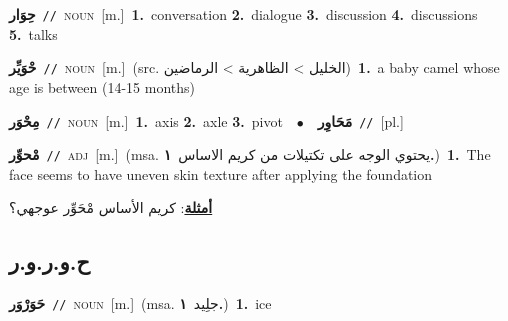 \documentclass[10pt,a4paper,twoside]{article} %
\begin{document}
\begin{multicols}{2}
{\setlength\topsep{0pt}\textbf{\foreignlanguage{arabic}{حِوَار}}\ {\color{gray}\texttt{//}\color{black}}\ \textsc{noun}\ [m.]\ \textbf{1.}~conversation  \textbf{2.}~dialogue  \textbf{3.}~discussion  \textbf{4.}~discussions  \textbf{5.}~talks\ } \vspace{2mm}

{\setlength\topsep{0pt}\textbf{\foreignlanguage{arabic}{حْوَيِّر}}\ {\color{gray}\texttt{//}\color{black}}\ \textsc{noun}\ [m.]\ (src. \color{gray}\foreignlanguage{arabic}{الخليل > الظاهرية > الرماضين}\color{black})\ \textbf{1.}~a baby camel whose age is between (14-15 months)\ } \vspace{2mm}

{\setlength\topsep{0pt}\textbf{\foreignlanguage{arabic}{مِحْوَر}}\ {\color{gray}\texttt{//}\color{black}}\ \textsc{noun}\ [m.]\ \textbf{1.}~axis  \textbf{2.}~axle  \textbf{3.}~pivot\ \ $\bullet$\ \ \setlength\topsep{0pt}\textbf{\foreignlanguage{arabic}{مَحَاوِر}}\ {\color{gray}\texttt{//}\color{black}}\ [pl.]\ } \vspace{2mm}

{\setlength\topsep{0pt}\textbf{\foreignlanguage{arabic}{مْحوِّر}}\ {\color{gray}\texttt{//}\color{black}}\ \textsc{adj}\ [m.]\ \color{gray}(msa. \foreignlanguage{arabic}{يحتوي الوجه على تكتيلات من كريم الاساس}~\foreignlanguage{arabic}{\textbf{١.}})\color{black}\ \textbf{1.}~The face seems to have uneven skin texture after applying the foundation\  \begin{flushright}\color{gray}\foreignlanguage{arabic}{\textbf{\underline{\foreignlanguage{arabic}{أمثلة}}}: كريم الأساس مْحَوِّر عوجهي؟}\end{flushright}\color{black}} \vspace{2mm}

\vspace{-3mm}
\subsection*{\color{blue}\foreignlanguage{arabic}{ح.و.ر.و.ر}\color{blue}{ (ntws)}} 

{\setlength\topsep{0pt}\textbf{\foreignlanguage{arabic}{حَوَرْوَر}}\ {\color{gray}\texttt{//}\color{black}}\ \textsc{noun}\ [m.]\ \color{gray}(msa. \foreignlanguage{arabic}{جلِيد}~\foreignlanguage{arabic}{\textbf{١.}})\color{black}\ \textbf{1.}~ice\ } \vspace{2mm}


\end{multicols}
\end{document}
